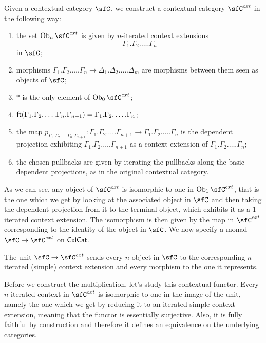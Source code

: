 \begin{construction}\cite[21]{Lum10}
  Given a contextual category $\sfC$, we construct a contextual category
  $\sfC^{cxt}$ in the following way:
  \begin{enumerate}
    \item the set $\Ob_n\sfC^{cxt}$ is given by $n$-iterated context extensions
      \[\Gamma_1.\Gamma_2.\ldots.\Gamma_n\]
      in $\sfC$;
    \item morphisms
      $\Gamma_1.\Gamma_2.\ldots.\Gamma_n\rightarrow\Delta_1.\Delta_2.\ldots.\Delta_m$
      are morphisms between them seen as objects of $\sfC$;
    \item $*$ is the only element of $\Ob_0\sfC^{cxt}$;
    \item
      $\operatorname{\mathsf{ft}}(\Gamma_1.\Gamma_2.\ldots.\Gamma_n.\Gamma_{n+1})=\Gamma_1.\Gamma_2.\ldots.\Gamma_n$;
    \item the map $p_{\Gamma_1.\Gamma_2.\ldots.\Gamma_n.\Gamma_{n+1}}\colon
      \Gamma_1.\Gamma_2.\ldots.\Gamma_{n+1}\rightarrow
      \Gamma_1.\Gamma_2.\ldots.\Gamma_n$ is the dependent projection exhibiting
      $\Gamma_1.\Gamma_2.\ldots.\Gamma_{n+1}$ as a context extension of
      $\Gamma_1.\Gamma_2.\ldots.\Gamma_n$;
    \item the chosen pullbacks are given by iterating the pullbacks along the
      basic dependent projections, as in the original contextual category.
  \end{enumerate}

  As we can see, any object of $\sfC^{cxt}$ is isomorphic to one in
  $\Ob_1\sfC^{cxt}$, that is the one which we get by looking at the associated object
  in $\sfC$ and then taking the dependent projection from it to the terminal
  object, which exhibits it as a 1-iterated context extension. The isomorphism
  is then given by the map in $\sfC^{cxt}$ corresponding to the identity of the
  object in $\sfC$. We now specify a monad $\sfC\mapsto\sfC^{cxt}$ on $\operatorname{\mathsf{CxlCat}}$.

  The unit $\sfC\rightarrow\sfC^{cxt}$ sends every $n$-object in $\sfC$ to
  the corresponding $n$-iterated (simple) context extension and every morphism
  to the one it represents.

  Before we construct the multiplication, let's study this contextual functor.
  Every $n$-iterated
  context in $\sfC^{cxt}$ is isomorphic to one in the image of the unit, namely
  the one which we get by reducing it to an iterated simple context extension,
  meaning that the functor is essentially surjective. Also, it is fully faithful
  by construction and therefore it defines an equivalence on the underlying
  categories.


\end{construction}
